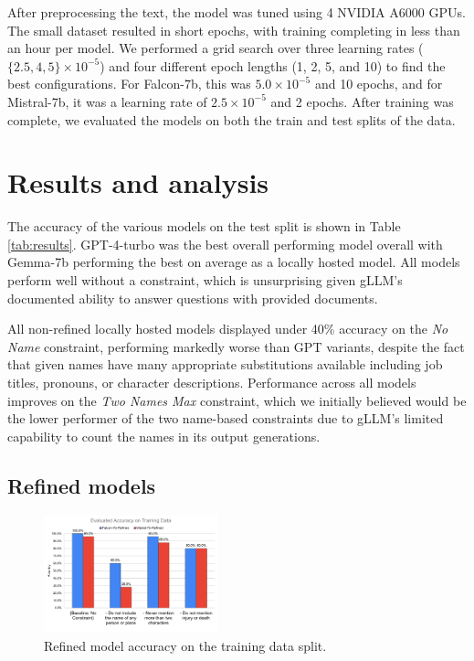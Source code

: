 \documentclass[11pt]{article}
\newcommand{\gptfour}{GPT-4-turbo\xspace}
\newcommand{\falcon}{Falcon-7b\xspace}
\newcommand{\gemma}{Gemma-7b\xspace}
\newcommand{\mistral}{Mistral-7b\xspace}
\newcommand{\noname}{\textit{No Name}\xspace}
\newcommand{\twonamesmax}{\textit{Two Names Max}\xspace}
\begin{document}
After preprocessing the text, the model was tuned using 4 NVIDIA A6000 GPUs. The small dataset resulted in short epochs, with training completing in less than an hour per model. We performed a grid search over three learning rates ($\{2.5, 4, 5\} \times 10^{-5}$) and four different epoch lengths (1, 2, 5, and 10) to find the best configurations. For \falcon, this was $5.0 \times 10^{-5}$ and 10 epochs, and for \mistral, it was a learning rate of $2.5 \times 10^{-5}$ and 2 epochs. After training was complete, we evaluated the models on both the train and test splits of the data.

\section{Results and analysis}

The accuracy of the various models on the test split is shown in Table \ref{tab:results}. \gptfour was the best overall performing model overall with \gemma performing the best on average as a locally hosted model.
All models perform well without a constraint, which is unsurprising given gLLM's documented ability to answer questions with provided documents.

All non-refined locally hosted models displayed under 40\% accuracy on the \noname constraint, performing markedly worse than GPT variants, despite the fact that given names have many appropriate substitutions available including job titles, pronouns, or character descriptions. Performance across all models improves on the \twonamesmax constraint, which we initially believed would be the lower performer of the two name-based constraints due to gLLM's limited capability to count the names in its output generations.

\subsection{Refined models}

\begin{figure}[htb]
    \centering
    \includegraphics[width=0.45\textwidth]{figures/refined_training.pdf}
    \caption{Refined model accuracy on the training data split.}
    \label{fig:training-eval}
\end{figure}
\end{document}
